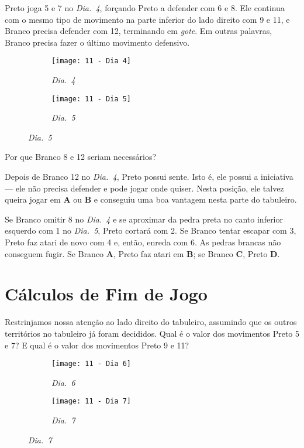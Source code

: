 \pagebreak

Preto joga 5 e 7 no \emph{Dia.\@~4}, forçando Preto a defender com 6 e 8. Ele continua com o mesmo tipo de movimento na parte inferior do lado direito com 9 e 11, e Branco precisa defender com 12, terminando em \emph{gote}. Em outras palavras, Branco precisa fazer o último movimento defensivo.

\begin{figure}[h!]
    \centering
    \begin{subfigure}[t]{.475\textwidth}
        \texttt{[image: 11 - Dia 4]}
        \captionsetup{justification=centering}
        \caption*{\emph{Dia.\@~4}}
    \end{subfigure}
    \hfill
    \begin{subfigure}[t]{.475\textwidth}
        \texttt{[image: 11 - Dia 5]}
        \captionsetup{justification=centering}
        \caption*{\emph{Dia.\@~5}}
    \end{subfigure}
\end{figure}

Por que Branco 8 e 12 seriam necessários?

Depois de Branco 12 no \emph{Dia.\@~4}, Preto possui sente. Isto é, ele possui a iniciativa --- ele não precisa defender e pode jogar onde quiser. Nesta posição, ele talvez queira jogar em \textbf{A} ou \textbf{B} e conseguiu uma boa vantagem nesta parte do tabuleiro.

Se Branco omitir 8 no \emph{Dia.\@~4} e se aproximar da pedra preta no canto inferior esquerdo com 1 no \emph{Dia.\@~5}, Preto cortará com 2. Se Branco tentar escapar com 3, Preto faz atari de novo com 4 e, então, enreda com 6. As pedras brancas não conseguem fugir. Se Branco \textbf{A}, Preto faz atari em \textbf{B}; se Branco \textbf{C}, Preto \textbf{D}.

\pagebreak

\section{Cálculos de Fim de Jogo}

Restrinjamos nossa atenção ao lado direito do tabuleiro, assumindo que os outros territórios no tabuleiro já foram decididos. Qual é o valor dos movimentos Preto 5 e 7? E qual é o valor dos movimentos Preto 9 e 11?

\begin{figure}[h!]
    \centering
    \begin{subfigure}[t]{.3\textwidth}
        \texttt{[image: 11 - Dia 6]}
        \captionsetup{justification=centering}
        \caption*{\emph{Dia.\@~6}}
    \end{subfigure}
    \hspace{1cm}
    \begin{subfigure}[t]{.3\textwidth}
        \texttt{[image: 11 - Dia 7]}
        \captionsetup{justification=centering}
        \caption*{\emph{Dia.\@~7}}
    \end{subfigure}
\end{figure}

